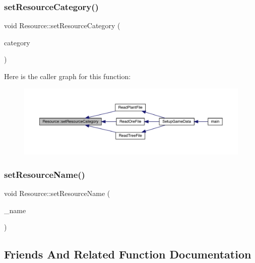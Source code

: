 \subsubsection{\texorpdfstring{set\+Resource\+Category()}{setResourceCategory()}}
{\footnotesize\ttfamily void Resource\+::set\+Resource\+Category (\begin{DoxyParamCaption}\item[{\mbox{\hyperlink{_resource_8hpp_abde177ff256dcb25ea4a492ad7335b82}{En\+Resource\+Category}}}]{category }\end{DoxyParamCaption})}

Here is the caller graph for this function\+:
\nopagebreak
\begin{figure}[H]
\begin{center}
\leavevmode
\includegraphics[width=350pt]{df/d00/class_resource_adc6d68e48afd6949da3211ed2668ddbd_icgraph}
\end{center}
\end{figure}
\mbox{\label{class_resource_a651a4afa0312b61b86ca0255c9bc64d0}} 
\subsubsection{\texorpdfstring{set\+Resource\+Name()}{setResourceName()}}
{\footnotesize\ttfamily void Resource\+::set\+Resource\+Name (\begin{DoxyParamCaption}\item[{std\+::string}]{\+\_\+name }\end{DoxyParamCaption})}



\subsection{Friends And Related Function Documentation}
\mbox{\label{class_resource_aa5280b133aff1f25ff03e4e4835c2a83}} 
